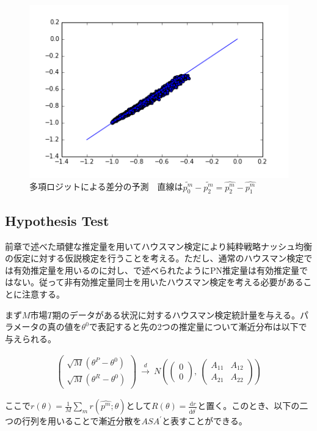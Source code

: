 \documentclass{jsarticle}
\begin{document}
\begin{figure}[t]
\centering
\includegraphics{logit.png}
\caption{多項ロジットによる差分の予測　直線は$\tilde{p_0^m} - \tilde{p_2^m} = \hat{p_2^m} - \hat{p_1^m}$}
\end{figure}

\subsection{Hypothesis Test}
前章で述べた頑健な推定量を用いてハウスマン検定により純粋戦略ナッシュ均衡の仮定に対する仮説検定を行うことを考える。ただし、通常のハウスマン検定では有効推定量を用いるのに対し、\cite{Tamer2003a}で述べられたようにPN推定量は有効推定量ではない。従って非有効推定量同士を用いたハウスマン検定を考える必要があることに注意する。

まず$M$市場$T$期のデータがある状況に対するハウスマン検定統計量を与える。パラメータの真の値を$\theta^0$で表記すると先の2つの推定量について漸近分布は以下で与えられる。

\begin{align*}
	\begin{pmatrix}
	\sqrt{M}(\theta^P - \theta^0)\\[8pt]
	\sqrt{M}(\theta^R - \theta^0)
	\end{pmatrix}\ \xrightarrow{d}\ 
	N\left( \begin{pmatrix}0\\[8pt]0
	\end{pmatrix},\ 
	\begin{pmatrix}
	A_{11} & A_{12}\\[8pt]
	A_{21} & A_{22}
	\end{pmatrix}
	\right)
\end{align*}

ここで$r(\theta) = \frac{1}{M} \sum_m r(\hat{p^m} ; \theta)$として$R(\theta) = \frac{\mathrm{d}r}{\mathrm{d} \theta^{'}}$と置く。このとき、以下の二つの行列を用いることで漸近分散を$A S A^{'}$と表すことができる。
\end{document}
